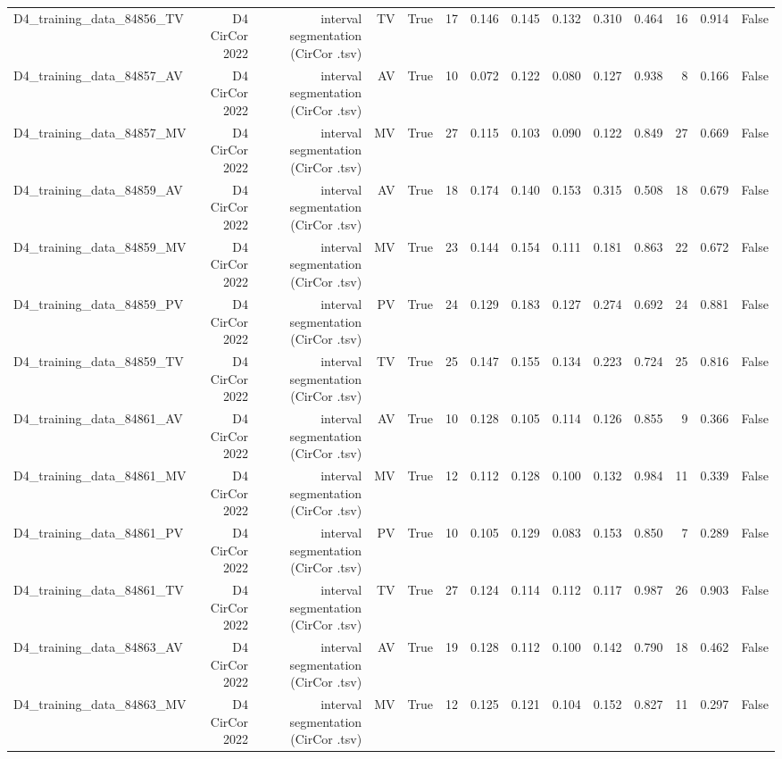 \begin{table}[htbp]
\begin{tabular}{lrrrrrrrrrrrrr}
    D4\_training\_data\_84856\_TV & D4 CirCor 2022 & interval segmentation (CirCor .tsv) & TV & True & 17 & 0.146 & 0.145 & 0.132 & 0.310 & 0.464 & 16 & 0.914 & False \\
    D4\_training\_data\_84857\_AV & D4 CirCor 2022 & interval segmentation (CirCor .tsv) & AV & True & 10 & 0.072 & 0.122 & 0.080 & 0.127 & 0.938 & 8 & 0.166 & False \\
    D4\_training\_data\_84857\_MV & D4 CirCor 2022 & interval segmentation (CirCor .tsv) & MV & True & 27 & 0.115 & 0.103 & 0.090 & 0.122 & 0.849 & 27 & 0.669 & False \\
    D4\_training\_data\_84859\_AV & D4 CirCor 2022 & interval segmentation (CirCor .tsv) & AV & True & 18 & 0.174 & 0.140 & 0.153 & 0.315 & 0.508 & 18 & 0.679 & False \\
    D4\_training\_data\_84859\_MV & D4 CirCor 2022 & interval segmentation (CirCor .tsv) & MV & True & 23 & 0.144 & 0.154 & 0.111 & 0.181 & 0.863 & 22 & 0.672 & False \\
    D4\_training\_data\_84859\_PV & D4 CirCor 2022 & interval segmentation (CirCor .tsv) & PV & True & 24 & 0.129 & 0.183 & 0.127 & 0.274 & 0.692 & 24 & 0.881 & False \\
    D4\_training\_data\_84859\_TV & D4 CirCor 2022 & interval segmentation (CirCor .tsv) & TV & True & 25 & 0.147 & 0.155 & 0.134 & 0.223 & 0.724 & 25 & 0.816 & False \\
    D4\_training\_data\_84861\_AV & D4 CirCor 2022 & interval segmentation (CirCor .tsv) & AV & True & 10 & 0.128 & 0.105 & 0.114 & 0.126 & 0.855 & 9 & 0.366 & False \\
    D4\_training\_data\_84861\_MV & D4 CirCor 2022 & interval segmentation (CirCor .tsv) & MV & True & 12 & 0.112 & 0.128 & 0.100 & 0.132 & 0.984 & 11 & 0.339 & False \\
    D4\_training\_data\_84861\_PV & D4 CirCor 2022 & interval segmentation (CirCor .tsv) & PV & True & 10 & 0.105 & 0.129 & 0.083 & 0.153 & 0.850 & 7 & 0.289 & False \\
    D4\_training\_data\_84861\_TV & D4 CirCor 2022 & interval segmentation (CirCor .tsv) & TV & True & 27 & 0.124 & 0.114 & 0.112 & 0.117 & 0.987 & 26 & 0.903 & False \\
    D4\_training\_data\_84863\_AV & D4 CirCor 2022 & interval segmentation (CirCor .tsv) & AV & True & 19 & 0.128 & 0.112 & 0.100 & 0.142 & 0.790 & 18 & 0.462 & False \\
    D4\_training\_data\_84863\_MV & D4 CirCor 2022 & interval segmentation (CirCor .tsv) & MV & True & 12 & 0.125 & 0.121 & 0.104 & 0.152 & 0.827 & 11 & 0.297 & False \\

\end{tabular}
\end{table}
